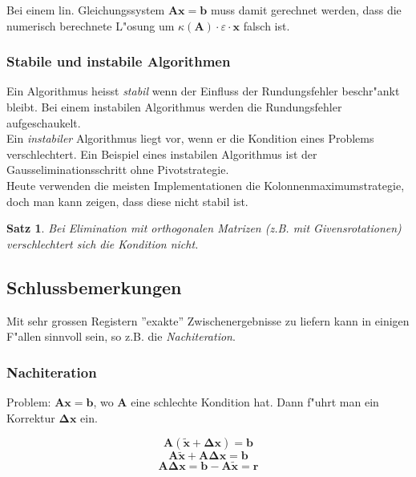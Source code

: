 \documentclass[german, 10pt, a4paper, twocolumn]{scrartcl}
\newtheorem{satz}{Satz}[section]
\theoremstyle{definition}
\begin{document}
Bei einem lin. Gleichungssystem $\mathbf{A} \mathbf{x} = \mathbf{b}$ muss damit gerechnet werden, dass die numerisch berechnete L"osung um $\kappa(\mathbf{A}) \cdotp \varepsilon \cdotp \mathbf{x}$ falsch ist.

\subsubsection{Stabile und instabile Algorithmen}

Ein Algorithmus heisst \textit{stabil} wenn der Einfluss der Rundungsfehler beschr"ankt bleibt. Bei einem instabilen Algorithmus werden die Rundungsfehler aufgeschaukelt.\\
Ein \textit{instabiler} Algorithmus liegt vor, wenn er die Kondition eines Problems verschlechtert. Ein Beispiel eines instabilen Algorithmus ist der Gausseliminationsschritt ohne Pivotstrategie.\\
Heute verwenden die meisten Implementationen die Kolonnenmaximumstrategie, doch man kann zeigen, dass diese nicht stabil ist.

\begin{satz}
	Bei Elimination mit orthogonalen Matrizen (z.B. mit Givensrotationen) verschlechtert sich die Kondition nicht.
\end{satz}

\subsection{Schlussbemerkungen}

Mit sehr grossen Registern ''exakte'' Zwischenergebnisse zu liefern kann in einigen F"allen sinnvoll sein, so z.B. die \textit{Nachiteration}.

\subsubsection{Nachiteration}

Problem: $\mathbf{A}\mathbf{x} = \mathbf{b}$, wo $\mathbf{A}$ eine schlechte Kondition hat. Dann f"uhrt man ein Korrektur $\mathbf{\Delta x}$ ein.

\begin{displaymath}
	\mathbf{A}(\mathbf{\widetilde{x}}+\mathbf{\Delta x}) = \mathbf{b}
\end{displaymath}
\begin{displaymath}
	\mathbf{A}\mathbf{\widetilde{x}} + \mathbf{A}\mathbf{\Delta x} = \mathbf{b}
\end{displaymath}
\begin{displaymath}
	\mathbf{A}\mathbf{\Delta x} = \mathbf{b} - \mathbf{A}\mathbf{\widetilde{x}} = \mathbf{r}
\end{displaymath}
\end{document}
